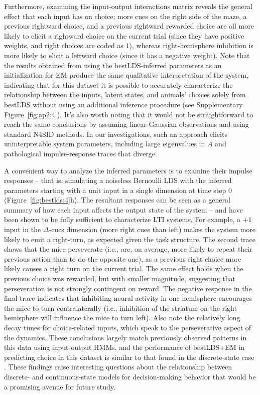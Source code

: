 Furthermore, examining the input-output interactions matrix reveals the general effect that each input has on choice; more cues on the right side of the maze, a previous rightward choice, and a previous rightward rewarded choice are all more likely to elicit a rightward choice on the current trial (since they have positive weights, and right choices are coded as $1$), whereas right-hemisphere inhibition is more likely to elicit a leftward choice (since it has a negative weight). Note that the results obtained from using the bestLDS-inferred parameters as an initialization for EM produce the same qualitative interpretation of the system, indicating that for this dataset it is possible to accurately characterize the relationship between the inputs, latent states, and animals' choices solely from bestLDS without using an additional inference procedure (see Supplementary Figure~\ref{fig:ap2:4}). It's also worth noting that it would not be straightforward to reach the same conclusions by assuming linear-Gaussian observations and using standard N4SID methods. In our investigations, such an approach elicits uninterpretable system parameters, including large eigenvalues in $A$ and pathological impulse-response traces that diverge. 

A convenient way to analyze the inferred parameters is to examine their impulse responses -- that is, simulating a noiseless Bernoulli LDS with the inferred parameters starting with a unit input in a single dimension at time step $0$ (Figure~\ref{fig:bestlds:4}h). The resultant responses can be seen as a general summary of how each input affects the output state of the system -- and have been shown to be fully sufficient to characterize LTI systems. For example, a $+1$ input in the $\Delta$-cues dimension (more right cues than left) makes the system more likely to emit a right-turn, as expected given the task structure. The second trace shows that the mice perseverate (i.e., are, on average, more likely to repeat their previous action than to do the opposite one), as a previous right choice more likely causes a right turn on the current trial. The same effect holds when the previous choice was rewarded, but with smaller magnitude, suggesting that perseveration is not strongly contingent on reward. The negative response in the final trace indicates that inhibiting neural activity in one hemisphere encourages the mice to turn contralaterally (i.e., inhibition of the striatum on the right hemisphere will influence the mice to turn left). Also note the relatively long decay times for choice-related inputs, which speak to the perseverative aspect of the dynamics. These conclusions largely match previously observed patterns in this data using input-output HMMs, and the performance of bestLDS+EM in predicting choice in this dataset is similar to that found in the discrete-state case \cite{bolkan_opponent_2022}. These findings raise interesting questions about the relationship between discrete- and continuous-state models for decision-making behavior that would be a promising avenue for future study. 